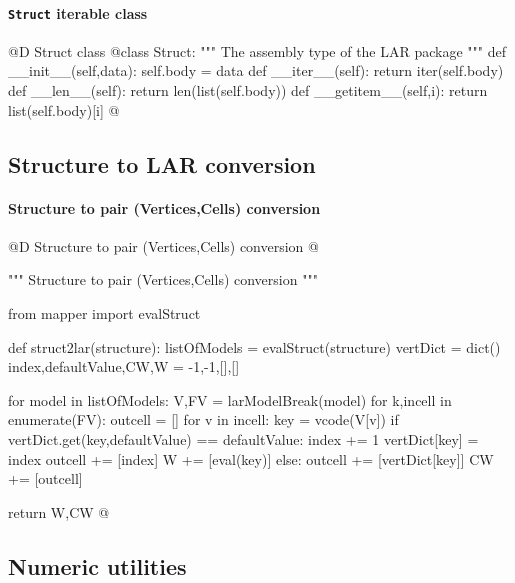 \documentclass[11pt,oneside]{article}	%
\begin{document}
\paragraph{\texttt{Struct} iterable class}
@D Struct class
@{class Struct:
    """ The assembly type of the LAR package """
    def __init__(self,data):
        self.body = data
    def __iter__(self):
        return iter(self.body)
    def __len__(self):
        return len(list(self.body))
    def __getitem__(self,i):
        return list(self.body)[i]
@}



\subsection{Structure to LAR conversion}


\paragraph{Structure to pair (Vertices,Cells) conversion}
@D Structure to pair (Vertices,Cells) conversion
@{""" Structure to pair (Vertices,Cells) conversion """

from mapper import evalStruct

def struct2lar(structure):
	listOfModels = evalStruct(structure)
	vertDict = dict()
	index,defaultValue,CW,W = -1,-1,[],[]
		
	for model in listOfModels:
		V,FV = larModelBreak(model)
		for k,incell in enumerate(FV):
			outcell = []
			for v in incell:
				key = vcode(V[v])
				if vertDict.get(key,defaultValue) == defaultValue:
					index += 1
					vertDict[key] = index
					outcell += [index]
					W += [eval(key)]
				else: 
					outcell += [vertDict[key]]
			CW += [outcell]
			
	return W,CW
@}

\subsection{Numeric utilities}
\end{document}
